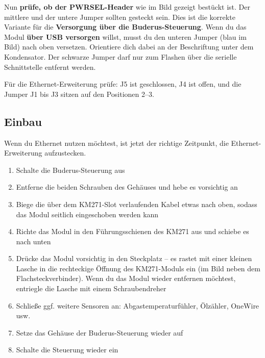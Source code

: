 \documentclass[
  9pt,
]{extarticle}
\providecommand{\tightlist}{%
  \setlength{\itemsep}{0pt}\setlength{\parskip}{0pt}}
\begin{document}
Nun \textbf{prüfe, ob der PWRSEL-Header} wie im Bild gezeigt bestückt
ist. Der mittlere und der untere Jumper sollten gesteckt sein. Dies ist
die korrekte Variante für die \textbf{Versorgung über die
Buderus-Steuerung}. Wenn du das Modul \textbf{über USB versorgen}
willst, musst du den unteren Jumper (blau im Bild) nach oben versetzen.
Orientiere dich dabei an der Beschriftung unter dem Kondensator. Der
schwarze Jumper darf nur zum Flashen über die serielle Schnittstelle
entfernt werden.

Für die Ethernet-Erweiterung prüfe: J5 ist geschlossen, J4 ist offen,
und die Jumper J1 bis J3 sitzen auf den Positionen 2--3.

\subsection{Einbau}\label{einbau}

Wenn du Ethernet nutzen möchtest, ist jetzt der richtige Zeitpunkt, die
Ethernet-Erweiterung aufzustecken.

\begin{enumerate}
\def\labelenumi{\arabic{enumi}.}
\tightlist
\item
  Schalte die Buderus-Steuerung aus\\
\item
  Entferne die beiden Schrauben des Gehäuses und hebe es vorsichtig an\\
\item
  Biege die über dem KM271-Slot verlaufenden Kabel etwas nach oben,
  sodass das Modul seitlich eingeschoben werden kann\\
\item
  Richte das Modul in den Führungsschienen des KM271 aus und schiebe es
  nach unten\\
\item
  Drücke das Modul vorsichtig in den Steckplatz -- es rastet mit einer
  kleinen Lasche in die rechteckige Öffnung des KM271-Moduls ein (im
  Bild neben dem Flachsteckverbinder). Wenn du das Modul wieder
  entfernen möchtest, entriegle die Lasche mit einem Schraubendreher\\
\item
  Schließe ggf. weitere Sensoren an: Abgastemperaturfühler, Ölzähler,
  OneWire usw.\\
\item
  Setze das Gehäuse der Buderus-Steuerung wieder auf\\
\item
  Schalte die Steuerung wieder ein
\end{enumerate}
\end{document}
